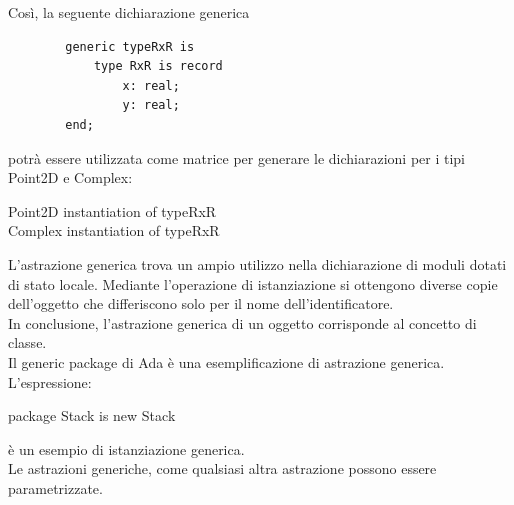 \documentclass{article}
\begin{document}
	Così, la seguente dichiarazione generica
	\begin{verbatim}
		generic typeRxR is
			type RxR is record
				x: real;
				y: real;
		end;
	\end{verbatim}
	potrà essere utilizzata come matrice per generare le dichiarazioni per i tipi Point2D e Complex:
	\begin{center}
	Point2D instantiation of typeRxR \\
	Complex instantiation of typeRxR
	\end{center}
	L'astrazione generica trova un ampio utilizzo nella dichiarazione di moduli dotati di stato locale. Mediante l'operazione di istanziazione si ottengono diverse copie dell'oggetto che differiscono solo per il nome dell'identificatore. \\
	In conclusione, l'astrazione generica di un oggetto corrisponde al concetto di classe.
	\vspace{\baselineskip} \\
	Il generic package di Ada è una esemplificazione di astrazione generica. L'espressione:
	\begin{center}
		package Stack is new Stack
	\end{center}
	è un esempio di istanziazione generica.
	\vspace{\baselineskip} \\
	Le astrazioni generiche, come qualsiasi altra astrazione possono essere parametrizzate.
\end{document}
